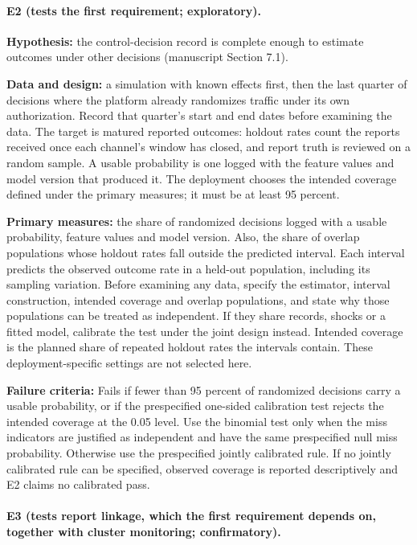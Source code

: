 \documentclass[
  11pt,
]{article}
\begin{document}
\hypertarget{e2-tests-the-first-requirement-exploratory.}{%
\paragraph{E2 (tests the first requirement;
exploratory).}\label{e2-tests-the-first-requirement-exploratory.}}

\textbf{Hypothesis:} the control-decision record is complete enough to
estimate outcomes under other decisions (manuscript Section 7.1).

\textbf{Data and design:} a simulation with known effects first, then
the last quarter of decisions where the platform already randomizes
traffic under its own authorization. Record that quarter's start and end
dates before examining the data. The target is matured reported
outcomes: holdout rates count the reports received once each channel's
window has closed, and report truth is reviewed on a random sample. A
usable probability is one logged with the feature values and model
version that produced it. The deployment chooses the intended coverage
defined under the primary measures; it must be at least 95 percent.

\textbf{Primary measures:} the share of randomized decisions logged with
a usable probability, feature values and model version. Also, the share
of overlap populations whose holdout rates fall outside the predicted
interval. Each interval predicts the observed outcome rate in a held-out
population, including its sampling variation. Before examining any data,
specify the estimator, interval construction, intended coverage and
overlap populations, and state why those populations can be treated as
independent. If they share records, shocks or a fitted model, calibrate
the test under the joint design instead. Intended coverage is the
planned share of repeated holdout rates the intervals contain. These
deployment-specific settings are not selected here.

\textbf{Failure criteria:} Fails if fewer than 95 percent of randomized
decisions carry a usable probability, or if the prespecified one-sided
calibration test rejects the intended coverage at the 0.05 level. Use
the binomial test only when the miss indicators are justified as
independent and have the same prespecified null miss probability.
Otherwise use the prespecified jointly calibrated rule. If no jointly
calibrated rule can be specified, observed coverage is reported
descriptively and E2 claims no calibrated pass.

\hypertarget{e3-tests-report-linkage-which-the-first-requirement-depends-on-together-with-cluster-monitoring-confirmatory.}{%
\paragraph{E3 (tests report linkage, which the first requirement depends
on, together with cluster monitoring;
confirmatory).}\label{e3-tests-report-linkage-which-the-first-requirement-depends-on-together-with-cluster-monitoring-confirmatory.}}
\end{document}
